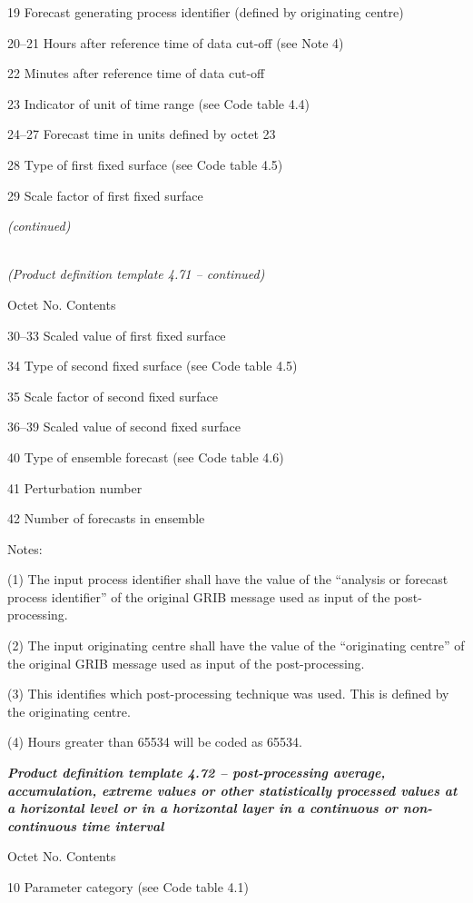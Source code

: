 19 Forecast generating process identifier (defined by originating centre)

20--21 Hours after reference time of data cut-off (see Note 4)

22 Minutes after reference time of data cut-off

23 Indicator of unit of time range (see Code table 4.4)

24--27 Forecast time in units defined by octet 23

28 Type of first fixed surface (see Code table 4.5)

29 Scale factor of first fixed surface

\emph{(continued)}

\emph{\\
(Product definition template 4.71 -- continued)}

Octet No. Contents

30--33 Scaled value of first fixed surface

34 Type of second fixed surface (see Code table 4.5)

35 Scale factor of second fixed surface

36--39 Scaled value of second fixed surface

40 Type of ensemble forecast (see Code table 4.6)

41 Perturbation number

42 Number of forecasts in ensemble

Notes:

(1) The input process identifier shall have the value of the ``analysis or forecast process identifier'' of the original GRIB message used as input of the post-processing.

(2) The input originating centre shall have the value of the ``originating centre'' of the original GRIB message used as input of the post-processing.

(3) This identifies which post-processing technique was used. This is defined by the originating centre.

(4) Hours greater than 65534 will be coded as 65534.

\emph{\textbf{Product definition template 4.72 -- post-processing average, accumulation, extreme values or other statistically processed values at a horizontal level or in a horizontal layer in a continuous or non-continuous time interval}}

Octet No. Contents

10 Parameter category (see Code table 4.1)

